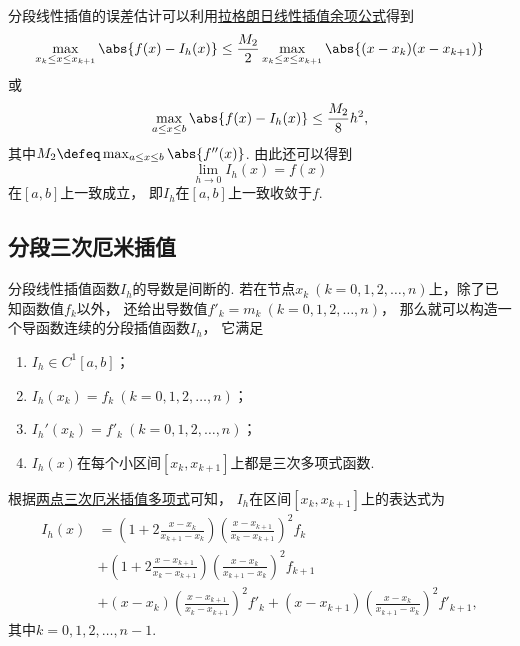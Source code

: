分段线性插值的误差估计可以利用\hyperref[equation:拉格朗日插值.线性插值余项]{拉格朗日线性插值余项公式}得到\begin{equation*}
	\max_{x_k \leq x \leq x_{k+1}}
	\abs{f(x) - I_h(x)}
	\leq \frac{M_2}{2}
	\max_{x_k \leq x \leq x_{k+1}}
	\abs{(x - x_k) (x - x_{k+1})}
\end{equation*}
或\begin{equation*}
	\max_{a \leq x \leq b}
	\abs{f(x) - I_h(x)}
	\leq \frac{M_2}{8} h^2,
\end{equation*}
其中\(M_2 \defeq \max_{a \leq x \leq b} \abs{f''(x)}\).
由此还可以得到\begin{equation*}
	\lim_{h\to0} I_h(x) = f(x)
\end{equation*}
在\([a,b]\)上一致成立，
即\(I_h\)在\([a,b]\)上一致收敛于\(f\).

\subsection{分段三次厄米插值}
分段线性插值函数\(I_h\)的导数是间断的.
若在节点\(x_k\ (k=0,1,2,\dotsc,n)\)上，除了已知函数值\(f_k\)以外，
还给出导数值\(f'_k = m_k\ (k=0,1,2,\dotsc,n)\)，
那么就可以构造一个导函数连续的分段插值函数\(I_h\)，
它满足\begin{enumerate}
	\item \(I_h \in C^1[a,b]\)；
	\item \(I_h(x_k) = f_k\ (k=0,1,2,\dotsc,n)\)；
	\item \(I_h'(x_k) = f'_k\ (k=0,1,2,\dotsc,n)\)；
	\item \(I_h(x)\)在每个小区间\([x_k,x_{k+1}]\)上都是三次多项式函数.
\end{enumerate}

根据\hyperref[equation:厄米插值.两点三次厄米插值多项式]{两点三次厄米插值多项式}可知，
\(I_h\)在区间\([x_k,x_{k+1}]\)上的表达式为\begin{equation*}
	\begin{aligned}
		I_h(x)
		&= \left( 1 + 2 \frac{x - x_k}{x_{k+1} - x_k} \right)
		\left( \frac{x - x_{k+1}}{x_k - x_{k+1}} \right)^2
		f_k \\
		&+ \left( 1 + 2 \frac{x - x_{k+1}}{x_k - x_{k+1}} \right)
		\left( \frac{x - x_k}{x_{k+1} - x_k} \right)^2
		f_{k+1} \\
		&+ (x - x_k)
		\left( \frac{x - x_{k+1}}{x_k - x_{k+1}} \right)^2
		f'_k
		+ (x - x_{k+1})
		\left( \frac{x - x_k}{x_{k+1} - x_k} \right)^2
		f'_{k+1},
	\end{aligned}
\end{equation*}
其中\(k=0,1,2,\dotsc,n-1\).

